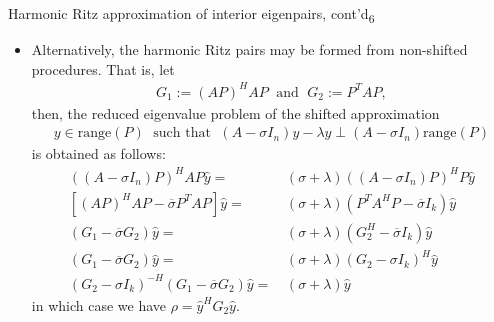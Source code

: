 \documentclass[t,usepdftitle=false]{beamer}
\begin{document}
\begin{frame}{Harmonic Ritz approximation of interior eigenpairs, cont'd\textsubscript{6}}
\begin{itemize}
\item Alternatively, the harmonic Ritz pairs may be formed from non-shifted procedures.
That is, let 
\begin{align*}
G_1:=(AP)^HAP
\;\text{ and }\;
G_2:=P^ TAP,
\end{align*}
then, the reduced eigenvalue problem of the shifted approximation 
\begin{align*}
y\in\text{range}(P)
\;\text{ such that }\;
(A-\sigma I_n)y-\lambda y
\perp
(A-\sigma I_n)\text{range}(P)
\end{align*}
is obtained as follows:
\begin{align*}
((A-\sigma I_n)P)^HAP\hat{y}=&\,(\sigma+\lambda)((A-\sigma I_n)P)^HP\hat{y}\\
[(AP)^HAP-\overline{\sigma}P^TAP]\hat{y}=&\,(\sigma+\lambda)(P^TA^HP-\overline{\sigma}I_k)\hat{y}\\
(G_1-\overline{\sigma}G_2)\hat{y}=&\,(\sigma+\lambda)(G_2^H-\overline{\sigma}I_k)\hat{y}\\
(G_1-\overline{\sigma}G_2)\hat{y}=&\,(\sigma+\lambda)(G_2-\sigma I_k)^H\hat{y}\\
(G_2-\sigma I_k)^{-H}(G_1-\overline{\sigma}G_2)\hat{y}=&\,(\sigma+\lambda)\hat{y}
\end{align*}
in which case we have $\rho=\hat{y}^HG_2\hat{y}$.
\end{itemize}
\end{frame}
\end{document}

